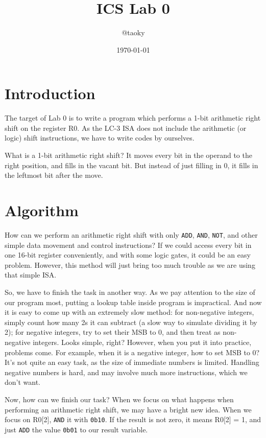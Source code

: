 \documentclass{article}
\title{ICS Lab 0}
\author{@taoky}
\date{\today}
\begin{document}
	\maketitle
	\section{Introduction}
	
	The target of Lab 0 is to write a program which performs a 1-bit arithmetic right shift on the register R0. As the LC-3 ISA does not include the arithmetic (or logic) shift instructions, we have to write codes by ourselves.
	
	What is a 1-bit arithmetic right shift? It moves every bit in the operand to the right position, and fills in the vacant bit. But instead of just filling in 0, it fills in the leftmost bit after the move. \cite{Arithmetic_shift}
	
	\section{Algorithm}
	
	How can we perform an arithmetic right shift with only \texttt{ADD}, \texttt{AND}, \texttt{NOT}, and other simple data movement and control instructions? If we could access every bit in one 16-bit register conveniently, and with some logic gates, it could be an easy problem. However, this method will just bring too much trouble as we are using that simple ISA.
	
	So, we have to finish the task in another way. As we pay attention to the size of our program most, putting a lookup table inside program is impractical. And now it is easy to come up with an extremely slow method: for non-negative integers, simply count how many 2s it can subtract (a slow way to simulate dividing it by 2); for negative integers, try to set their MSB to 0, and then treat as non-negative integers. Looks simple, right? However, when you put it into practice, problems come. For example, when it is a negative integer, how to set MSB to 0? It's not quite an easy task, as the size of immediate numbers is limited. Handling negative numbers is hard, and may involve much more instructions, which we don't want.
	
	Now, how can we finish our task? When we focus on what happens when performing an arithmetic right shift, we may have a bright new idea. When we focus on R0[2], \texttt{AND} it with \texttt{0b10}. If the result is not zero, it means R0[2] = 1, and just \texttt{ADD} the value \texttt{0b01} to our result variable.
	
\end{document}
